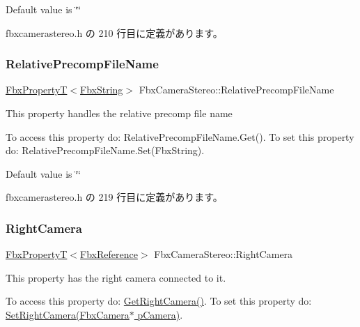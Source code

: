 Default value is \char`\"{}\char`\"{} 

 fbxcamerastereo.\+h の 210 行目に定義があります。

\mbox{\label{class_fbx_camera_stereo_af7d8b1be43665a8662630cdc2fdb0dbb}} 
\subsubsection{\texorpdfstring{Relative\+Precomp\+File\+Name}{RelativePrecompFileName}}
{\footnotesize\ttfamily \hyperlink{class_fbx_property_t}{Fbx\+PropertyT}$<$\hyperlink{class_fbx_string}{Fbx\+String}$>$ Fbx\+Camera\+Stereo\+::\+Relative\+Precomp\+File\+Name}

This property handles the relative precomp file name

To access this property do\+: Relative\+Precomp\+File\+Name.\+Get(). To set this property do\+: Relative\+Precomp\+File\+Name.\+Set(\+Fbx\+String).

Default value is \char`\"{}\char`\"{} 

 fbxcamerastereo.\+h の 219 行目に定義があります。

\mbox{\label{class_fbx_camera_stereo_ae4bbaad53a1ebbc0534f78c246affd84}} 
\subsubsection{\texorpdfstring{Right\+Camera}{RightCamera}}
{\footnotesize\ttfamily \hyperlink{class_fbx_property_t}{Fbx\+PropertyT}$<$\hyperlink{fbxtypes_8h_a44df6a2eec915cf27cd481e5c5e48a24}{Fbx\+Reference}$>$ Fbx\+Camera\+Stereo\+::\+Right\+Camera}

This property has the right camera connected to it.

To access this property do\+: \hyperlink{class_fbx_camera_stereo_a8c293c596ad0c3b9fb169bdf5b508a68}{Get\+Right\+Camera()}. To set this property do\+: \hyperlink{class_fbx_camera_stereo_a9b37a67b3bf1e94a6845077913083d78}{Set\+Right\+Camera(\+Fbx\+Camera$\ast$ p\+Camera)}.

